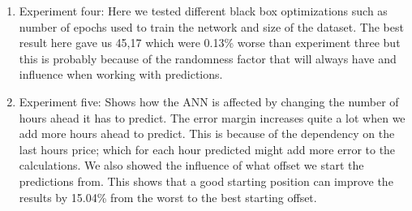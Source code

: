 \begin{enumerate}
	\item Experiment four: Here we tested different black box optimizations such as number of epochs used to train the network and size of the dataset. The best result here gave us 45,17 which were 0.13\% worse than experiment three but this is probably because of the randomness factor that will always have and influence when working with predictions.
	\item Experiment five: Shows how the ANN is affected by changing the number of hours ahead it has to predict. The error margin increases quite a lot when we add more hours ahead to predict. This is because of the dependency on the last hours price; which for each hour predicted might add more error to the calculations. We also showed the influence of what offset we start the predictions from. This shows that a good starting position can improve the results by 15.04\% from the worst to the best starting offset.
\end{enumerate}

